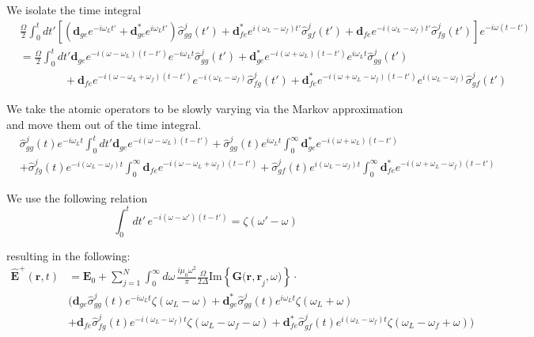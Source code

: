 \documentclass[a4paper, 11pt]{article}
\numberwithin{equation}{section}
\begin{document}
We isolate the time integral
\begin{align*}
  &\frac{\Omega}{2}\int_0^tdt' \left[\left(\mathbf{d}_{ge}e^{-i\omega_Lt'} +
  \mathbf{d}_{ge}^*e^{i\omega_Lt'}\right) \hat{\sigma}_{gg}^j(t')
  + \mathbf{d}_{fe}^*e^{i(\omega_L-\omega_f)t'}\hat{\sigma}_{gf}^j(t')+
\mathbf{d}_{fe}e^{-i(\omega_L-\omega_f)t'}\hat{\sigma}_{fg}^j(t')\right]e^{-i\omega(t-t')}\\
  &= \frac{\Omega}{2}\int_0^tdt'
  \mathbf{d}_{ge}e^{-i(\omega-\omega_L)(t-t')}e^{-i\omega_Lt}\hat{\sigma}_{gg}^j(t') +
  \mathbf{d}_{ge}^* e^{-i(\omega+\omega_L)(t-t')}e^{i\omega_Lt}\hat{\sigma}_{gg}^j(t')
  \\&\hspace{4em}+
  \mathbf{d}_{fe}e^{-i(\omega -
  \omega_L+\omega_f)(t-t')}e^{-i(\omega_L-\omega_f)}\hat{\sigma}_{fg}^j(t') +
  \mathbf{d}_{fe}^*e^{-i(\omega +
  \omega_L-\omega_f)(t-t')}e^{i(\omega_L-\omega_f)}\hat{\sigma}_{gf}^j(t')
\end{align*}

We take the atomic operators to be slowly varying via the Markov approximation and
move them out of the time integral.
\begin{equation}
  \begin{aligned}
  &\hat{\sigma}_{gg}^j(t)e^{-i\omega_Lt}\int_0^tdt'
  \mathbf{d}_{ge}e^{-i(\omega-\omega_L)(t-t')} + \hat{\sigma}_{gg}^j(t)e^{i\omega_Lt}\int_0^\infty
  \mathbf{d}_{ge}^* e^{-i(\omega+\omega_L)(t-t')}
  \\&+
  \hat{\sigma}_{fg}^j(t)e^{-i(\omega_L-\omega_f)t}\int_0^\infty \mathbf{d}_{fe}e^{-i(\omega -
  \omega_L+\omega_f)(t-t')}+ \hat{\sigma}_{gf}^j(t)e^{i(\omega_L-\omega_f)t}\int_0^\infty
  \mathbf{d}_{fe}^*e^{-i(\omega +
  \omega_L-\omega_f)(t-t')}
  \end{aligned}
\end{equation}

We use the following relation
\begin{equation}
\int_{0}^tdt'\,e^{-i(\omega-\omega')(t-t')}=\zeta(\omega'-\omega)
\end{equation}

resulting in the following:
\begin{equation}
  \begin{aligned}
    \hat{\mathbf{E}}^+(\mathbf{r}, t) &= \mathbf{E}_0 + \sum_{j=1}^N\int_0^\infty
    d\omega\,\frac{i\mu_0\omega^2}{\pi}\frac{\Omega}{2\Delta}\text{Im}
    \left\{\mathbf{G(r, r}_j, \omega)\right\} \cdot \\&\bigg(
      \mathbf{d}_{ge}\hat{\sigma}_{gg}^j(t)e^{-i\omega_Lt}\zeta(\omega_L-\omega) +
      \mathbf{d}_{ge}^*\hat{\sigma}_{gg}^j(t)e^{i\omega_Lt}\zeta(\omega_L+\omega)\\& +
      \mathbf{d}_{fe}\hat{\sigma}_{fg}^j(t)e^{-i(\omega_L-\omega_f)t}\zeta(\omega_L-\omega_f-\omega) +
    \mathbf{d}_{fe}^*\hat{\sigma}_{gf}^j(t)e^{i(\omega_L-\omega_f)t}\zeta(\omega_L-\omega_f+\omega)\bigg)
  \end{aligned}
\end{equation}
\end{document}
